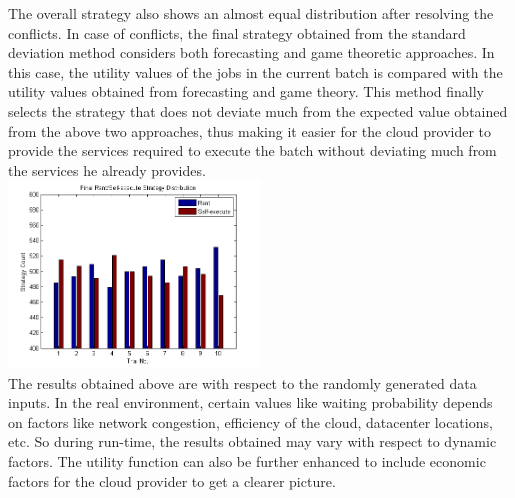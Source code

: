 \documentclass[conference]{IEEEtran}
\begin{document}
The overall strategy also shows an almost equal distribution after resolving the conflicts. In case of conflicts, the final strategy obtained from the standard deviation method considers both forecasting and game theoretic approaches. In this case, the utility values of the jobs in the current batch is compared with the utility values obtained from forecasting and game theory. This method finally selects the strategy that does not deviate much from the expected value obtained from the above two approaches, thus making it easier for the cloud provider to provide the services required to execute the batch without deviating much from the services he already provides.\\[0.3cm]
\includegraphics[width=0.5\textwidth]{final}\\[0.3cm]
The results obtained above are with respect to the randomly generated data inputs. In the real environment, certain values like waiting probability depends on factors like network congestion, efficiency of the cloud, datacenter locations, etc. So during run-time, the results obtained may vary with respect to dynamic factors. The utility function can also be further enhanced to include economic factors for the cloud provider to get a clearer picture. 
\end{document}
